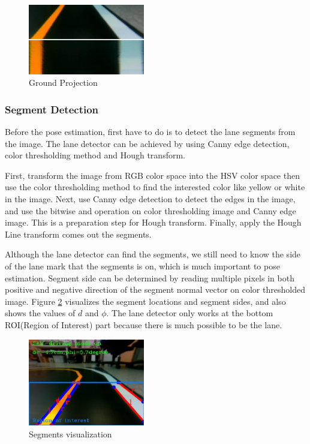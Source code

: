\documentclass[conference]{IEEEtran}
\begin{document}
\begin{figure}	
	\centering
	\includegraphics[width=2in]{img/extrinsic.png}
	\caption{Ground Projection}
	\label{fig:extrinsic}
\end{figure}
\FloatBarrier

\subsubsection{Segment Detection}

Before the pose estimation, first have to do is to detect the lane segments from the image. The lane detector can be achieved by using Canny edge detection, color thresholding method and Hough transform.

First, transform the image from RGB color space into the HSV color space then use the color thresholding method to find the interested color like yellow or white in the image. Next, use Canny edge detection to detect the edges in the image, and use the bitwise and operation on color thresholding image and Canny edge image. This is a preparation step for Hough transform. Finally, apply the Hough Line transform comes out the segments.
 
Although the lane detector can find the segments, we still need to know the side of the lane mark that the segments is on, which is much important to pose estimation. Segment side can be determined by reading multiple pixels in both positive and negative direction of the segment normal vector on color thresholded image. Figure \ref{fig:lane_detect} visualizes the segment locations and segment sides, and also shows the values of $d$ and $\phi$. The lane detector only works at the bottom ROI(Region of Interest) part because there is much possible to be the lane.

\FloatBarrier
\begin{figure}
	\centering
	\includegraphics[width=2in]{img/lane_detect.png}
	\caption{Segments visualization}
	\label{fig:lane_detect}
\end{figure}
\end{document}
